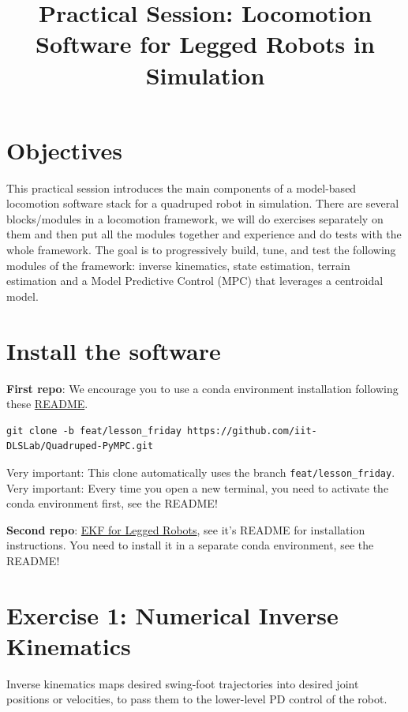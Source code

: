 \documentclass[11pt,a4paper]{article}
\title{\textbf{Practical Session: Locomotion Software for Legged Robots in Simulation}}
\author{}
\date{}
\begin{document}
\maketitle

\section*{Objectives}
This practical session introduces the main components of a model-based locomotion software stack for a quadruped robot in simulation. 
There are several blocks/modules  in a locomotion framework, we will do exercises separately on  them and then put all the modules together and experience and do tests with the whole framework.
The goal is to progressively build, tune, and test the following modules of the framework: inverse kinematics, state estimation, terrain estimation 
and a  Model Predictive Control (MPC) that leverages a centroidal model. 


\section*{Install the software}
\textbf{First repo}: We encourage you to use a conda environment installation following these \href{https://github.com/iit-DLSLab/Quadruped-PyMPC/tree/feat/lesson_friday/README_install.md}{README}.

\begin{verbatim}
git clone -b feat/lesson_friday https://github.com/iit-DLSLab/Quadruped-PyMPC.git
\end{verbatim}

\noindent Very important: This clone automatically uses the branch \texttt{feat/lesson\_friday}.\\
Very important: Every time you open a new terminal, you need to activate the conda environment first, see the README!


\vspace{1cm}

\noindent \textbf{Second repo}: \href{https://github.com/giulioturrisi/ekf-legged-robot-pytorch}{EKF for Legged Robots}, see it's README for installation instructions. You need to install it in a separate conda environment, see the README!

\section*{Exercise 1: Numerical Inverse Kinematics}

Inverse kinematics maps desired swing-foot trajectories into desired joint positions or velocities, to pass them to the lower-level PD control of the robot.
 
\end{document}

